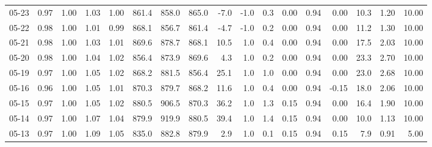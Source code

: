 \begin{threeparttable}
{\begin{tabular}{lrrrrrrrrrrrrrrrr}
  05-23 &         0.97 &           1.00 &          1.03 &          1.00 & 861.4 & 858.0 & 865.0 &       -7.0 &                     -1.0 &                 0.3 &       0.00 &      0.94 &           0.00 &             10.3 &            1.20 &                  10.00 \\
  05-22 &         0.98 &           1.00 &          1.01 &          0.99 & 868.1 & 856.7 & 861.4 &       -4.7 &                     -1.0 &                 0.2 &       0.00 &      0.94 &           0.00 &             11.2 &            1.30 &                  10.00 \\
  05-21 &         0.98 &           1.00 &          1.03 &          1.01 & 869.6 & 878.7 & 868.1 &       10.5 &                      1.0 &                 0.4 &       0.00 &      0.94 &           0.00 &             17.5 &            2.03 &                  10.00 \\
  05-20 &         0.98 &           1.00 &          1.04 &          1.02 & 856.4 & 873.9 & 869.6 &        4.3 &                      1.0 &                 0.2 &       0.00 &      0.94 &           0.00 &             23.3 &            2.70 &                  10.00 \\
  05-19 &         0.97 &           1.00 &          1.05 &          1.02 & 868.2 & 881.5 & 856.4 &       25.1 &                      1.0 &                 1.0 &       0.00 &      0.94 &           0.00 &             23.0 &            2.68 &                  10.00 \\
  05-16 &         0.96 &           1.00 &          1.05 &          1.01 & 870.3 & 879.7 & 868.2 &       11.6 &                      1.0 &                 0.4 &       0.00 &      0.94 &          -0.15 &             18.0 &            2.06 &                  10.00 \\
  05-15 &         0.97 &           1.00 &          1.05 &          1.02 & 880.5 & 906.5 & 870.3 &       36.2 &                      1.0 &                 1.3 &       0.15 &      0.94 &           0.00 &             16.4 &            1.90 &                  10.00 \\
  05-14 &         0.97 &           1.00 &          1.07 &          1.04 & 879.9 & 919.9 & 880.5 &       39.4 &                      1.0 &                 1.4 &       0.15 &      0.94 &           0.00 &             10.0 &            1.13 &                  10.00 \\
  05-13 &         0.97 &           1.00 &          1.09 &          1.05 & 835.0 & 882.8 & 879.9 &        2.9 &                      1.0 &                 0.1 &       0.15 &      0.94 &           0.15 &              7.9 &            0.91 &                   5.00 \\

\end{tabular}}
\end{threeparttable}
